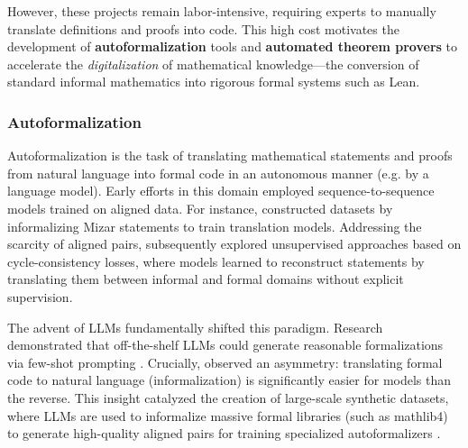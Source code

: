 \documentclass[11pt]{article}
\numberwithin{equation}{section}
\begin{document}
However, these projects remain labor-intensive, requiring experts to manually translate definitions and proofs into code. This high cost motivates the development of \textbf{autoformalization} tools and \textbf{automated theorem provers} to accelerate the \textit{digitalization} of mathematical knowledge—the conversion of standard informal mathematics into rigorous formal systems such as Lean.










\subsubsection{Autoformalization}

Autoformalization is the task of translating mathematical statements and proofs from natural language into formal code in an autonomous manner (e.g. by a language model). Early efforts in this domain employed sequence-to-sequence models trained on aligned data. For instance, \cite{wang2018first} constructed datasets by informalizing Mizar statements to train translation models. Addressing the scarcity of aligned pairs, \cite{wang2020exploration} subsequently explored unsupervised approaches based on cycle-consistency losses, where models learned to reconstruct statements by translating them between informal and formal domains without explicit supervision.

The advent of LLMs fundamentally shifted this paradigm. Research demonstrated that off-the-shelf LLMs could generate reasonable formalizations via few-shot prompting \cite{wu2022autoformalization,gadgil2022towards,agrawal2022towards,azerbayev2023proofnet}. Crucially, \cite{wu2022autoformalization} observed an asymmetry: translating formal code to natural language (informalization) is significantly easier for models than the reverse. This insight catalyzed the creation of large-scale synthetic datasets, where LLMs are used to informalize massive formal libraries (such as mathlib4) to generate high-quality aligned pairs for training specialized autoformalizers \cite{jiang2023multilingual,lu2024process,gao2025herald,liu2025rethinking}.
\end{document}
